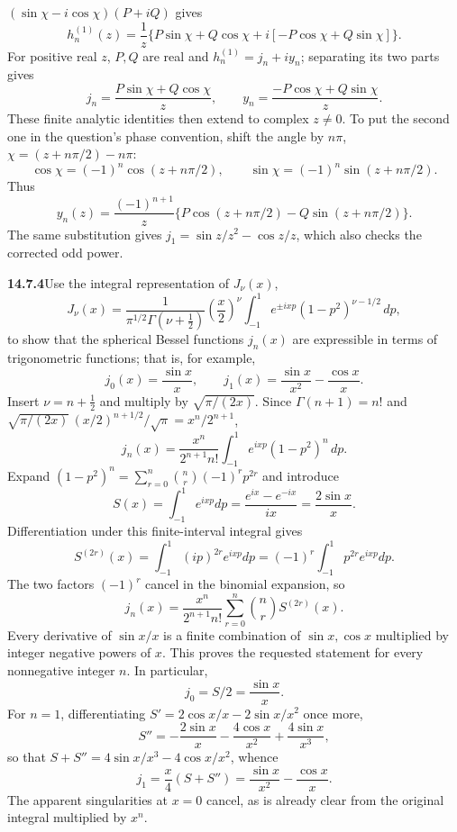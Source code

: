 $(\sin\chi-i\cos\chi)(P+iQ)$ gives
\[
h_n^{(1)}(z)=\frac1z
\{P\sin\chi+Q\cos\chi+i[-P\cos\chi+Q\sin\chi]\}.
\]
For positive real $z$, $P,Q$ are real and $h_n^{(1)}=j_n+iy_n$;
separating its two parts gives
\[
\boxed{j_n=\frac{P\sin\chi+Q\cos\chi}{z},\qquad
 y_n=\frac{-P\cos\chi+Q\sin\chi}{z}.}
\]
These finite analytic identities then extend to complex $z\ne0$.
To put the second one in the question's phase convention, shift
the angle by $n\pi$, $\chi=(z+n\pi/2)-n\pi$:
\[
\cos\chi=(-1)^n\cos(z+n\pi/2),\qquad
\sin\chi=(-1)^n\sin(z+n\pi/2).
\]
Thus
\[
\boxed{y_n(z)=\frac{(-1)^{n+1}}z
\{P\cos(z+n\pi/2)-Q\sin(z+n\pi/2)\}.}
\]
The same substitution gives $j_1=\sin z/z^2-\cos z/z$,
which also checks the corrected odd power.

\par\bigskip
\noindent\textbf{14.7.4}\quad Use the integral representation of
$J_{\nu}(x)$,
\[
J_{\nu}(x)=\frac{1}{\pi^{1/2}\Gamma(\nu+\frac{1}{2})}
\left(\frac{x}{2}\right)^{\nu}
\int_{-1}^{1}e^{\pm ixp}(1-p^{2})^{\nu-1/2}\,dp,
\]
to show that the spherical Bessel functions $j_{n}(x)$ are expressible
in terms of trigonometric functions; that is, for example,
\[
j_{0}(x)=\frac{\sin x}{x},\qquad
j_{1}(x)=\frac{\sin x}{x^{2}}-\frac{\cos x}{x}.
\]
\solution
Insert $\nu=n+\tfrac12$ and multiply by
$\sqrt{\pi/(2x)}$. Since $\Gamma(n+1)=n!$ and
$\sqrt{\pi/(2x)}\,(x/2)^{n+1/2}/\sqrt\pi=x^n/2^{n+1}$,
\[
j_n(x)=\frac{x^n}{2^{n+1}n!}
\int_{-1}^1e^{ixp}(1-p^2)^n\,dp.
\]
Expand $(1-p^2)^n=\sum_{r=0}^n\binom nr(-1)^rp^{2r}$ and introduce
\[
S(x)=\int_{-1}^1e^{ixp}dp=\frac{e^{ix}-e^{-ix}}{ix}
=\frac{2\sin x}{x}.
\]
Differentiation under this finite-interval integral gives
\[
S^{(2r)}(x)=\int_{-1}^1(ip)^{2r}e^{ixp}dp
=(-1)^r\int_{-1}^1p^{2r}e^{ixp}dp.
\]
The two factors $(-1)^r$ cancel in the binomial expansion, so
\[
\boxed{j_n(x)=\frac{x^n}{2^{n+1}n!}
\sum_{r=0}^n\binom nr S^{(2r)}(x).}
\]
Every derivative of $\sin x/x$ is a finite combination of
$\sin x,\cos x$ multiplied by integer negative powers of $x$.
This proves the requested statement for every nonnegative integer
$n$. In particular,
\[
j_0=S/2=\frac{\sin x}{x}.
\]
For $n=1$, differentiating $S'=2\cos x/x-2\sin x/x^2$ once more,
\[
S''=-\frac{2\sin x}{x}-\frac{4\cos x}{x^2}
+\frac{4\sin x}{x^3},
\]
so that $S+S''=4\sin x/x^3-4\cos x/x^2$, whence
\[
j_1=\frac x4(S+S'')=\frac{\sin x}{x^2}-\frac{\cos x}{x}.
\]
The apparent singularities at $x=0$ cancel, as is already clear
from the original integral multiplied by $x^n$.

